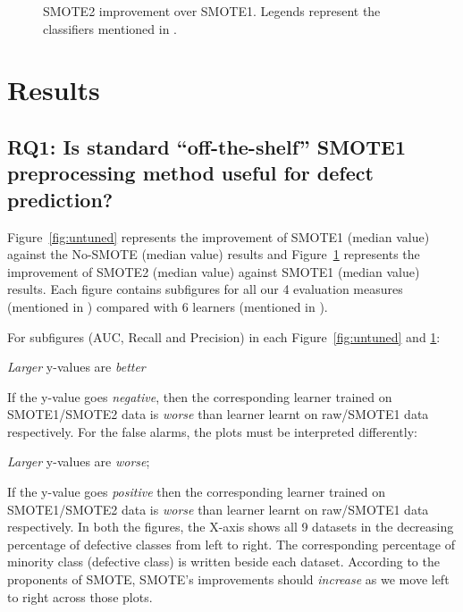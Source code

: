 \begin{figure}[!t]
    \caption{SMOTE2 improvement over SMOTE1. Legends represent the classifiers mentioned in .}
    \vspace{-10pt}
    \label{fig:tuned}
\vspace{-0.7cm}

\end{figure}

\section{Results}
\label{sect:results}

\subsection{\textbf{RQ1: Is standard ``off-the-shelf'' SMOTE1 preprocessing method useful for defect prediction?}}
Figure~\ref{fig:untuned} represents the improvement of SMOTE1 (median value) against the No-SMOTE (median value) results and Figure~\ref{fig:tuned} represents the improvement of SMOTE2 (median value) against SMOTE1 (median value) results. Each figure contains subfigures for all our 4 evaluation measures (mentioned in ) compared with 6 learners (mentioned in ). 



For subfigures (AUC, Recall and Precision) in each Figure~\ref{fig:untuned} and \ref{fig:tuned}:
\bi
\item 
{\em Larger} y-values
are {\em better} 
\item
If the y-value goes {\em negative}, then the corresponding learner trained on SMOTE1/SMOTE2 data is {\em worse} than learner learnt on raw/SMOTE1 data respectively. 
\ei
For the false alarms, the
plots must be interpreted differently:
\bi
\item
{\em Larger} y-values are {\em worse};
\item
If the y-value goes {\em positive} then the corresponding learner trained on SMOTE1/SMOTE2 data is {\em worse} than learner learnt on raw/SMOTE1 data respectively.
\ei
In both the figures, the
X-axis shows all 9 datasets in the decreasing percentage of defective classes from left to right. The corresponding percentage of minority class (defective class) is written beside each dataset. 
According to the proponents
of SMOTE, SMOTE's improvements should
{\em increase} as we move left to right
across those plots.

